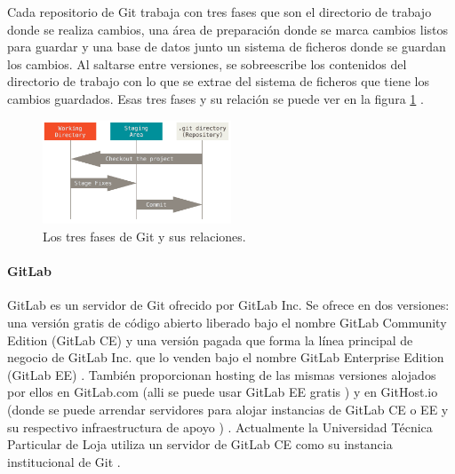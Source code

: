 Cada repositorio de Git trabaja con tres fases que son el directorio de trabajo donde se realiza cambios, una área de preparación donde se marca cambios listos para guardar y una base de datos junto un sistema de ficheros donde se guardan los cambios. Al saltarse entre versiones, se sobreescribe los contenidos del directorio de trabajo con lo que se extrae del sistema de ficheros que tiene los cambios guardados. Esas tres fases y su relación se puede ver en la figura \ref{Git-Fases} \citep{PROGIT-Git-Intro}.

\begin{figure}
  \begin{center}
      \includegraphics[width=0.5\textwidth]{Figures/git-fases.png}
  \end{center}
  \caption{Los tres fases de Git y sus relaciones. \citep{PROGIT-Git-Intro}}
  \label{Git-Fases}
\end{figure}

\paragraph{GitLab}
GitLab es un servidor de Git ofrecido por GitLab Inc. Se ofrece en dos versiones: una versión gratis \citep{GitLab-Products} de código abierto liberado bajo el nombre GitLab Community Edition (GitLab CE) y una versión pagada que forma la línea principal de negocio de GitLab Inc. que lo venden bajo el nombre GitLab Enterprise Edition (GitLab EE) \citep{GitLab-About}. También proporcionan hosting de las mismas versiones alojados por ellos en GitLab.com (alli se puede usar GitLab EE gratis \citep{GitLab-GitLab.com} \citep{GitLab-Products}) y en GitHost.io (donde se puede arrendar servidores para alojar instancias de GitLab CE o EE y su respectivo infraestructura de apoyo \citep{GitHost.io}) \citep{GitLab-About}. Actualmente la Universidad Técnica Particular de Loja utiliza un servidor de GitLab CE como su instancia institucional de Git \citep{UTPL-GitLab}.

